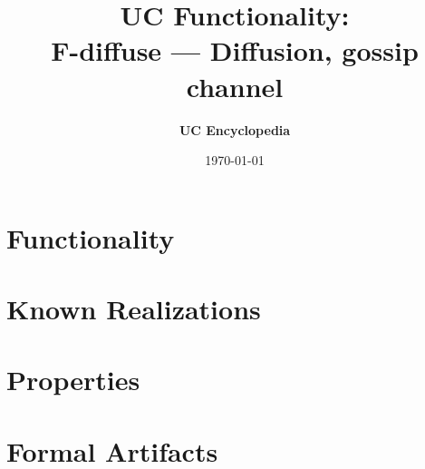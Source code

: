 \documentclass[11pt,a4paper]{article}
\title{\textbf{\Large UC Functionality:}\\[0.2em] \Large F-diffuse --- Diffusion, gossip channel}
\author{\textbf{UC Encyclopedia}}
\date{\today}
\newtheorem{functionality}{Functionality}
\begin{document}
\maketitle

\begin{abstract}
\end{abstract}

\section{Functionality}

%

\section{Known Realizations}


\section{Properties}


\section{Formal Artifacts}

\end{document}
